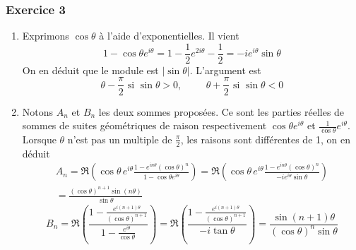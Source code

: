 \subsubsection*{Exercice 3}
\begin{enumerate}
\item Exprimons $\cos \theta$ à l'aide d'exponentielles. Il vient
\begin{displaymath}
  1-\cos\theta e^{i\theta}=1-\frac{1}{2}e^{2i\theta}-\frac{1}{2}=-i e^{i\theta}\sin \theta
\end{displaymath}
On en déduit que le module est $|\sin \theta |$. L'argument est
\begin{displaymath}
\theta - \frac{\pi}{2} \text{ si } \sin \theta > 0,  \hspace{1cm}
\theta + \frac{\pi}{2} \text{ si } \sin \theta < 0
\end{displaymath}

\item Notons $A_{n}$ et $B_{n}$ les deux sommes proposées. Ce sont les parties réelles de sommes de suites géométriques de raison respectivement $\cos\theta e^{i\theta}$ et $\frac{1}{\cos\theta} e^{i\theta}$. Lorsque $\theta$ n'est pas un multiple de $\frac{\pi}{2}$, les raisons sont différentes de 1, on en déduit
\begin{multline*}
A_{n} = \Re\left(\cos\theta \,e^{i\theta}\frac{1- e^{i n \theta}(\cos\theta)^{n}}{1-\cos\theta e^{i\theta}}\right) 
 = \Re\left(\cos\theta \,e^{i\theta}\frac{1- e^{i n \theta}(\cos\theta)^{n}}{-i e^{i\theta}\sin \theta }\right) \\
 = \frac{(\cos \theta)^{n+1}\sin(n\theta)}{\sin\theta}
\end{multline*}
\begin{displaymath}
B_{n} = \Re\left(\frac{1-\frac{ e^{i(n+1)\theta}}{(\cos\theta)^{n+1}}}{1-\frac{e^{i\theta}}{\cos\theta}}\right) 
 = \Re\left(\frac{1-\frac{ e^{i(n+1)\theta}}{(\cos\theta)^{n+1}}}{-i\tan\theta}\right)
 = \frac{\sin(n+1)\theta}{(\cos\theta)^{n}\sin\theta}
\end{displaymath}

\end{enumerate}
